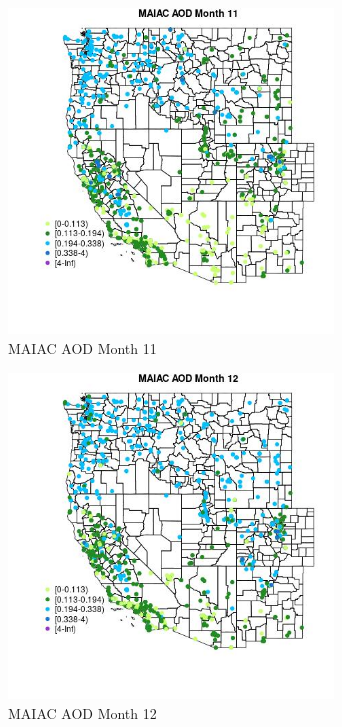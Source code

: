 \begin{figure} 
\centering  
\includegraphics[width=0.77\textwidth]{Code_Outputs/Report_ML_input_PM25_Step4_part_f_de_duplicated_aveswNAs_MapObsMo11MAIAC_AOD.jpg} 
\caption{\label{fig:Report_ML_input_PM25_Step4_part_f_de_duplicated_aveswNAsMapObsMo11MAIAC_AOD}MAIAC AOD Month 11} 
\end{figure} 
 

\clearpage 

\begin{figure} 
\centering  
\includegraphics[width=0.77\textwidth]{Code_Outputs/Report_ML_input_PM25_Step4_part_f_de_duplicated_aveswNAs_MapObsMo12MAIAC_AOD.jpg} 
\caption{\label{fig:Report_ML_input_PM25_Step4_part_f_de_duplicated_aveswNAsMapObsMo12MAIAC_AOD}MAIAC AOD Month 12} 
\end{figure} 
 

